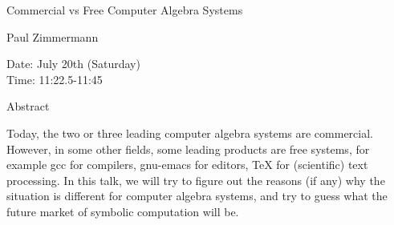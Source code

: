 \begin{center}
\LARGE
Commercial vs Free Computer Algebra Systems 
\end{center}

\begin{center}
\Large
Paul Zimmermann

\end{center}

\noindent
Date:  July 20th (Saturday) \\
Time:  11:22.5-11:45\\

\begin{center}
\large
Abstract
\end{center}

Today, the two or three leading computer algebra systems are commercial. However, in some
other fields, some leading products are free systems, for example gcc for compilers, gnu-emacs
for editors, TeX for (scientific) text processing. In this talk, we will try to figure out the reasons (if
any) why the situation is different for computer algebra systems, and try to guess what the future
market of symbolic computation will be. 


